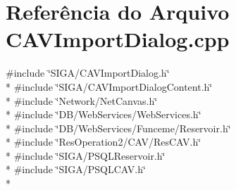 \section{Referência do Arquivo C\+A\+V\+Import\+Dialog.\+cpp}
\label{_c_a_v_import_dialog_8cpp}
{\ttfamily \#include \char`\"{}S\+I\+G\+A/\+C\+A\+V\+Import\+Dialog.\+h\char`\"{}}\\*
{\ttfamily \#include \char`\"{}S\+I\+G\+A/\+C\+A\+V\+Import\+Dialog\+Content.\+h\char`\"{}}\\*
{\ttfamily \#include \char`\"{}Network/\+Net\+Canvas.\+h\char`\"{}}\\*
{\ttfamily \#include \char`\"{}D\+B/\+Web\+Services/\+Web\+Services.\+h\char`\"{}}\\*
{\ttfamily \#include \char`\"{}D\+B/\+Web\+Services/\+Funceme/\+Reservoir.\+h\char`\"{}}\\*
{\ttfamily \#include \char`\"{}Res\+Operation2/\+C\+A\+V/\+Res\+C\+A\+V.\+h\char`\"{}}\\*
{\ttfamily \#include \char`\"{}S\+I\+G\+A/\+P\+S\+Q\+L\+Reservoir.\+h\char`\"{}}\\*
{\ttfamily \#include \char`\"{}S\+I\+G\+A/\+P\+S\+Q\+L\+C\+A\+V.\+h\char`\"{}}\\*
